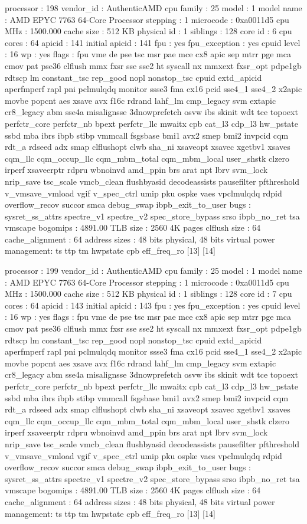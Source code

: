 processor	: 198
vendor_id	: AuthenticAMD
cpu family	: 25
model		: 1
model name	: AMD EPYC 7763 64-Core Processor
stepping	: 1
microcode	: 0xa0011d5
cpu MHz		: 1500.000
cache size	: 512 KB
physical id	: 1
siblings	: 128
core id		: 6
cpu cores	: 64
apicid		: 141
initial apicid	: 141
fpu		: yes
fpu_exception	: yes
cpuid level	: 16
wp		: yes
flags		: fpu vme de pse tsc msr pae mce cx8 apic sep mtrr pge mca cmov pat pse36 clflush mmx fxsr sse sse2 ht syscall nx mmxext fxsr_opt pdpe1gb rdtscp lm constant_tsc rep_good nopl nonstop_tsc cpuid extd_apicid aperfmperf rapl pni pclmulqdq monitor ssse3 fma cx16 pcid sse4_1 sse4_2 x2apic movbe popcnt aes xsave avx f16c rdrand lahf_lm cmp_legacy svm extapic cr8_legacy abm sse4a misalignsse 3dnowprefetch osvw ibs skinit wdt tce topoext perfctr_core perfctr_nb bpext perfctr_llc mwaitx cpb cat_l3 cdp_l3 hw_pstate ssbd mba ibrs ibpb stibp vmmcall fsgsbase bmi1 avx2 smep bmi2 invpcid cqm rdt_a rdseed adx smap clflushopt clwb sha_ni xsaveopt xsavec xgetbv1 xsaves cqm_llc cqm_occup_llc cqm_mbm_total cqm_mbm_local user_shstk clzero irperf xsaveerptr rdpru wbnoinvd amd_ppin brs arat npt lbrv svm_lock nrip_save tsc_scale vmcb_clean flushbyasid decodeassists pausefilter pfthreshold v_vmsave_vmload vgif v_spec_ctrl umip pku ospke vaes vpclmulqdq rdpid overflow_recov succor smca debug_swap ibpb_exit_to_user
bugs		: sysret_ss_attrs spectre_v1 spectre_v2 spec_store_bypass srso ibpb_no_ret tsa vmscape
bogomips	: 4891.00
TLB size	: 2560 4K pages
clflush size	: 64
cache_alignment	: 64
address sizes	: 48 bits physical, 48 bits virtual
power management: ts ttp tm hwpstate cpb eff_freq_ro [13] [14]

processor	: 199
vendor_id	: AuthenticAMD
cpu family	: 25
model		: 1
model name	: AMD EPYC 7763 64-Core Processor
stepping	: 1
microcode	: 0xa0011d5
cpu MHz		: 1500.000
cache size	: 512 KB
physical id	: 1
siblings	: 128
core id		: 7
cpu cores	: 64
apicid		: 143
initial apicid	: 143
fpu		: yes
fpu_exception	: yes
cpuid level	: 16
wp		: yes
flags		: fpu vme de pse tsc msr pae mce cx8 apic sep mtrr pge mca cmov pat pse36 clflush mmx fxsr sse sse2 ht syscall nx mmxext fxsr_opt pdpe1gb rdtscp lm constant_tsc rep_good nopl nonstop_tsc cpuid extd_apicid aperfmperf rapl pni pclmulqdq monitor ssse3 fma cx16 pcid sse4_1 sse4_2 x2apic movbe popcnt aes xsave avx f16c rdrand lahf_lm cmp_legacy svm extapic cr8_legacy abm sse4a misalignsse 3dnowprefetch osvw ibs skinit wdt tce topoext perfctr_core perfctr_nb bpext perfctr_llc mwaitx cpb cat_l3 cdp_l3 hw_pstate ssbd mba ibrs ibpb stibp vmmcall fsgsbase bmi1 avx2 smep bmi2 invpcid cqm rdt_a rdseed adx smap clflushopt clwb sha_ni xsaveopt xsavec xgetbv1 xsaves cqm_llc cqm_occup_llc cqm_mbm_total cqm_mbm_local user_shstk clzero irperf xsaveerptr rdpru wbnoinvd amd_ppin brs arat npt lbrv svm_lock nrip_save tsc_scale vmcb_clean flushbyasid decodeassists pausefilter pfthreshold v_vmsave_vmload vgif v_spec_ctrl umip pku ospke vaes vpclmulqdq rdpid overflow_recov succor smca debug_swap ibpb_exit_to_user
bugs		: sysret_ss_attrs spectre_v1 spectre_v2 spec_store_bypass srso ibpb_no_ret tsa vmscape
bogomips	: 4891.00
TLB size	: 2560 4K pages
clflush size	: 64
cache_alignment	: 64
address sizes	: 48 bits physical, 48 bits virtual
power management: ts ttp tm hwpstate cpb eff_freq_ro [13] [14]

